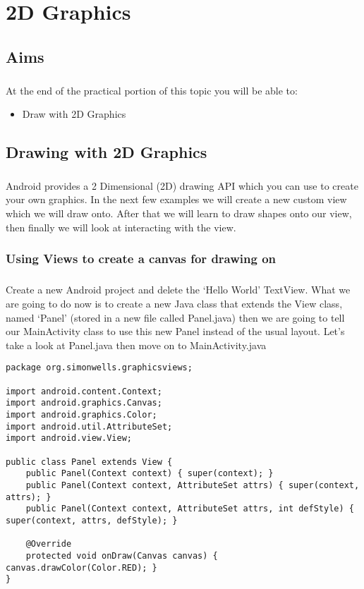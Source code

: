 \chapter{2D Graphics}
\section{Aims}
\paragraph{} At the end of the practical portion of this topic you will be able to:

\begin{itemize}
\item Draw with 2D Graphics
\end{itemize}

\section{Drawing with 2D Graphics}
\paragraph{} Android provides a 2 Dimensional (2D) drawing API which you can use to create your own graphics. In the next few examples we will create a new custom view which we will draw onto. After that we will learn to draw shapes onto our view, then finally we will look at interacting with the view.

\subsection{Using Views to create a canvas for drawing on}
\paragraph{} Create a new Android project and delete the `Hello World' TextView. What we are going to do now is to create a new Java class that extends the View class, named `Panel' (stored in a new file called Panel.java) then we are going to tell our MainActivity class to use this new Panel instead of the usual layout. Let's take a look at Panel.java then move on to MainActivity.java

\begin{lstlisting}
package org.simonwells.graphicsviews;

import android.content.Context;
import android.graphics.Canvas;
import android.graphics.Color;
import android.util.AttributeSet;
import android.view.View;

public class Panel extends View {
    public Panel(Context context) { super(context); }
    public Panel(Context context, AttributeSet attrs) { super(context, attrs); }
    public Panel(Context context, AttributeSet attrs, int defStyle) { super(context, attrs, defStyle); }

    @Override
    protected void onDraw(Canvas canvas) { canvas.drawColor(Color.RED); }
}
\end{lstlisting}

